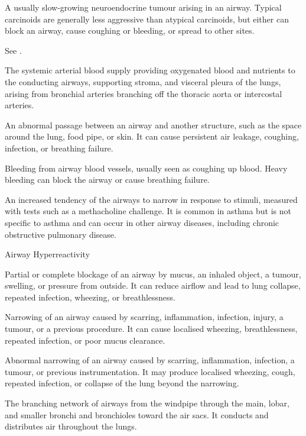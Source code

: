  A usually slow-growing neuroendocrine tumour arising in an airway. Typical carcinoids are generally less aggressive than atypical carcinoids, but either can block an airway, cause coughing or bleeding, or spread to other sites.

 See .

 The systemic arterial blood supply providing oxygenated blood and nutrients to the conducting airways, supporting stroma, and visceral pleura of the lungs, arising from bronchial arteries branching off the thoracic aorta or intercostal arteries.

 An abnormal passage between an airway and another structure, such as the space around the lung, food pipe, or skin. It can cause persistent air leakage, coughing, infection, or breathing failure.

 Bleeding from airway blood vessels, usually seen as coughing up blood. Heavy bleeding can block the airway or cause breathing failure.

 An increased tendency of the airways to narrow in response to stimuli, measured with tests such as a methacholine challenge. It is common in asthma but is not specific to asthma and can occur in other airway diseases, including chronic obstructive pulmonary disease.

\synonyms
Airway Hyperreactivity

 Partial or complete blockage of an airway by mucus, an inhaled object, a tumour, swelling, or pressure from outside. It can reduce airflow and lead to lung collapse, repeated infection, wheezing, or breathlessness.

 Narrowing of an airway caused by scarring,
inflammation, infection, injury, a tumour, or a previous procedure. It can
cause localised wheezing, breathlessness, repeated infection, or poor mucus
clearance.

 Abnormal narrowing of an airway caused by scarring, inflammation, infection, a tumour, or previous instrumentation. It may produce localised wheezing, cough, repeated infection, or collapse of the lung beyond the narrowing.

 The branching network of airways from the windpipe through the main, lobar, and smaller bronchi and bronchioles toward the air sacs. It conducts and distributes air throughout the lungs.

